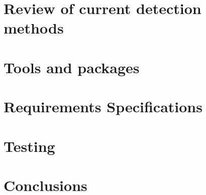 \documentclass[10pt,twoside]{book}
\begin{document}
%
%
%
%

\mainmatter

\part{Review of current detection methods}




\part{Tools and packages}

\part{Requirements Specifications}

\part{Testing}

\part{Conclusions}

\printbibliography


%
%
%
%
\end{document}
